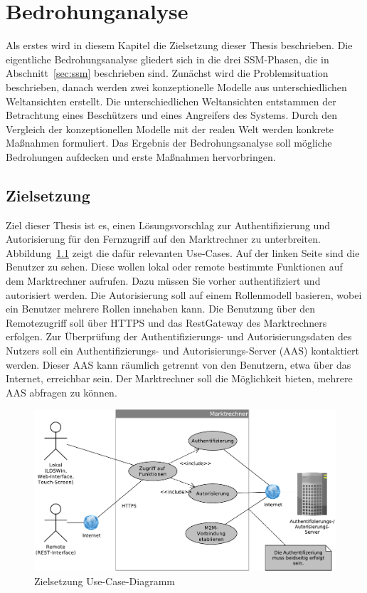 \documentclass[11pt,a4paper]{report}
\begin{document}
\chapter{Bedrohunganalyse} \label{chap:threat_analysis}

Als erstes wird in diesem Kapitel die Zielsetzung dieser Thesis beschrieben. Die eigentliche Bedrohungsanalyse gliedert sich in die drei SSM-Phasen, die in Abschnitt~\ref{sec:ssm} beschrieben sind. Zunächst wird die Problemsituation beschrieben, danach werden zwei konzeptionelle Modelle aus unterschiedlichen Weltansichten erstellt. Die unterschiedlichen Weltansichten entstammen der Betrachtung eines Beschützers und eines Angreifers des Systems. Durch den Vergleich der konzeptionellen Modelle mit der realen Welt werden konkrete Maßnahmen formuliert. Das Ergebnis der Bedrohungsanalyse soll mögliche Bedrohungen aufdecken und erste Maßnahmen hervorbringen. 

\section{Zielsetzung}

Ziel dieser Thesis ist es, einen Lösungsvorschlag zur Authentifizierung und Autorisierung für den Fernzugriff auf den Marktrechner zu unterbreiten. Abbildung~\ref{fig:uc_solution} zeigt die dafür relevanten Use-Cases. Auf der linken Seite sind die Benutzer zu sehen. Diese wollen lokal oder remote bestimmte Funktionen auf dem Marktrechner aufrufen. Dazu müssen Sie vorher authentifiziert und autorisiert werden. Die Autorisierung soll auf einem Rollenmodell basieren, wobei ein Benutzer mehrere Rollen innehaben kann. Die Benutzung über den Remotezugriff soll über HTTPS und das RestGateway des Marktrechners erfolgen. Zur Überprüfung der Authentifizierungs- und Autorisierungsdaten des Nutzers soll ein Authentifizierungs- und  Autorisierungs-Server (AAS) kontaktiert werden. Dieser AAS kann räumlich getrennt von den Benutzern, etwa über das Internet, erreichbar sein. Der Marktrechner soll die Möglichkeit bieten, mehrere AAS abfragen zu können.

\begin{figure}[htbp]
\centering
\includegraphics[scale=0.6]{images/ziel_usecase.pdf}
\caption{Zielsetzung Use-Case-Diagramm}
\label{fig:uc_solution}
\end{figure}
\end{document}
